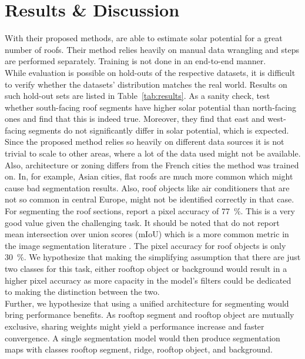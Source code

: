 \documentclass{article} %
\begin{document}
\section*{Results \& Discussion}
With their proposed methods, \citet{de2021predicting} are able to estimate solar potential for a great number of roofs. Their method relies heavily on manual data wrangling and steps are performed separately. Training is not done in an end-to-end manner.\\
While evaluation is possible on hold-outs of the respective datasets, it is difficult to verify whether the datasets' distribution matches the real world. Results on such hold-out sets are listed in Table~\ref{tab:results}. As a sanity check, \citet{de2021predicting} test whether south-facing roof segments have higher solar potential than north-facing ones and find that this is indeed true. Moreover, they find that east and west-facing segments do not significantly differ in solar potential, which is expected.\\
Since the proposed method relies so heavily on different data sources it is not trivial to scale to other areas, where a lot of the data used might not be available. Also, architecture or zoning differs from the French cities the method was trained on. In, for example, Asian cities, flat roofs are much more common which might cause bad segmentation results. Also, roof objects like air conditioners that are not so common in central Europe, might not be identified correctly in that case.\\
For segmenting the roof sections, \citet{de2021predicting} report a pixel accuracy of \SI{77}{\percent}. This is a very good value given the challenging task. It should be noted that \citet{de2021predicting} do not report mean intersection over union scores (mIoU) which is a more common metric in the image segmentation literature \cite{minaee2021image}. The pixel accuracy for roof objects is only \SI{30}{\percent}. We hypothesize that making the simplifying assumption that there are just two classes for this task, either rooftop object or background would result in a higher pixel accuracy as more capacity in the model's filters could be dedicated to making the distinction between the two.\\
Further, we hypothesize that using a unified architecture for segmenting would bring performance benefits. As rooftop segment and rooftop object are mutually exclusive, sharing weights might yield a performance increase and faster convergence. A single segmentation model would then produce segmentation maps with classes rooftop segment, ridge, rooftop object, and background.\\
\end{document}
